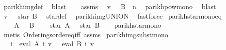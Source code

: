 \begin{isabellebody}
\ parikh{\isacharunderscore}{\kern0pt}img{\isacharunderscore}{\kern0pt}def\ \isamarkupfalse%
\ blast\isanewline
\ \ \isamarkupfalse%
\ assms\ \isamarkupfalse%
\ {\isachardoublequoteopen}v\ {\isasymin}\ {\isasymPsi}\ {\isacharparenleft}{\kern0pt}B\ {\isacharcircum}{\kern0pt}{\isacharcircum}{\kern0pt}\ n{\isacharparenright}{\kern0pt}{\isachardoublequoteclose}\ \isamarkupfalse%
\ parikh{\isacharunderscore}{\kern0pt}pow{\isacharunderscore}{\kern0pt}mono\ \isamarkupfalse%
\ blast\isanewline
\ \ \isamarkupfalse%
\ \isamarkupfalse%
\ {\isachardoublequoteopen}v\ {\isasymin}\ {\isasymPsi}\ {\isacharparenleft}{\kern0pt}star\ B{\isacharparenright}{\kern0pt}{\isachardoublequoteclose}\ \isamarkupfalse%
\ star{\isacharunderscore}{\kern0pt}def\ \isamarkupfalse%
\ parikh{\isacharunderscore}{\kern0pt}img{\isacharunderscore}{\kern0pt}UNION\ \isamarkupfalse%
\ fastforce\isanewline
{}\isamarkupfalse%
%
\endisatagproof
{\isafoldproof}%
%
\isadelimproof
\isanewline
%
\endisadelimproof
\isanewline
{}\isamarkupfalse%
\ parikh{\isacharunderscore}{\kern0pt}star{\isacharunderscore}{\kern0pt}mono{\isacharunderscore}{\kern0pt}eq{\isacharcolon}{\kern0pt}\isanewline
\ \ \ {\isachardoublequoteopen}{\isasymPsi}\ A\ {\isacharequal}{\kern0pt}\ {\isasymPsi}\ B{\isachardoublequoteclose}\isanewline
\ \ \ {\isachardoublequoteopen}{\isasymPsi}\ {\isacharparenleft}{\kern0pt}star\ A{\isacharparenright}{\kern0pt}\ {\isacharequal}{\kern0pt}\ {\isasymPsi}\ {\isacharparenleft}{\kern0pt}star\ B{\isacharparenright}{\kern0pt}{\isachardoublequoteclose}\isanewline
%
\isadelimproof
\ \ %
\endisadelimproof
%
\isatagproof
{}\isamarkupfalse%
\ parikh{\isacharunderscore}{\kern0pt}star{\isacharunderscore}{\kern0pt}mono\ \isamarkupfalse%
\ {\isacharparenleft}{\kern0pt}metis\ Orderings{\isachardot}{\kern0pt}order{\isacharunderscore}{\kern0pt}eq{\isacharunderscore}{\kern0pt}iff\ assms{\isacharparenright}{\kern0pt}%
\endisatagproof
{\isafoldproof}%
%
\isadelimproof
\isanewline
%
\endisadelimproof
\isanewline
\isanewline
{}\isamarkupfalse%
\ parikh{\isacharunderscore}{\kern0pt}img{\isacharunderscore}{\kern0pt}subst{\isacharunderscore}{\kern0pt}mono{\isacharcolon}{\kern0pt}\isanewline
\ \ \ {\isachardoublequoteopen}{\isasymforall}i{\isachardot}{\kern0pt}\ {\isasymPsi}\ {\isacharparenleft}{\kern0pt}eval\ {\isacharparenleft}{\kern0pt}A\ i{\isacharparenright}{\kern0pt}\ v{\isacharparenright}{\kern0pt}\ {\isasymsubseteq}\ {\isasymPsi}\ {\isacharparenleft}{\kern0pt}eval\ {\isacharparenleft}{\kern0pt}B\ i{\isacharparenright}{\kern0pt}\ v{\isacharparenright}{\kern0pt}{\isachardoublequoteclose}\isanewline

\end{isabellebody}
